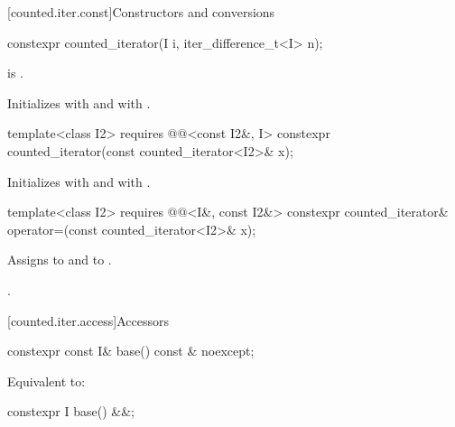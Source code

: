 [counted.iter.const]{Constructors and conversions}

%
\begin{itemdecl}
constexpr counted_iterator(I i, iter_difference_t<I> n);
\end{itemdecl}

\begin{itemdescr}
\pnum
\hardexpects
{} is .

\pnum
\effects
Initializes  with  and
 with .
\end{itemdescr}

%
\begin{itemdecl}
template<class I2>
  requires @@<const I2&, I>
    constexpr counted_iterator(const counted_iterator<I2>& x);
\end{itemdecl}

\begin{itemdescr}
\pnum
\effects
Initializes  with  and
 with .
\end{itemdescr}

%
\begin{itemdecl}
template<class I2>
  requires @@<I&, const I2&>
    constexpr counted_iterator& operator=(const counted_iterator<I2>& x);
\end{itemdecl}

\begin{itemdescr}
\pnum
\effects
Assigns  to  and
 to .

\pnum
\returns
{}.
\end{itemdescr}

[counted.iter.access]{Accessors}

%
\begin{itemdecl}
constexpr const I& base() const & noexcept;
\end{itemdecl}

\begin{itemdescr}
\pnum
\effects
Equivalent to: 
\end{itemdescr}

%
\begin{itemdecl}
constexpr I base() &&;
\end{itemdecl}

